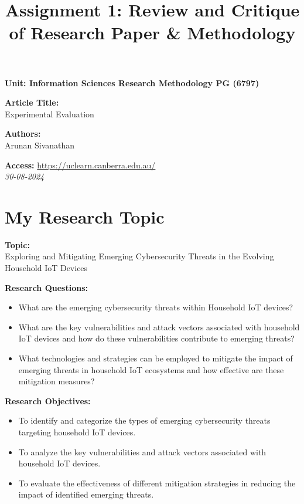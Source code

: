 \documentclass[a4paper,12pt]{article}
\title{Assignment 1: Review and Critique of Research Paper \& Methodology}
\author{}
\date{}
\begin{document}
\maketitle
\begin{flushleft}

\textbf{Unit: Information Sciences Research Methodology PG (6797)}

\vspace{0.5cm}

\textbf{Article Title:} \\
Experimental Evaluation 

\vspace{0.3cm}

\textbf{Authors:} \\
Arunan Sivanathan

\vspace{0.3cm}

\textbf{Access:} \url{https://uclearn.canberra.edu.au/} \\
\textit{30-08-2024}

\vspace{0.5cm}

\section*{My Research Topic}
\textbf{Topic:} \\
Exploring and Mitigating Emerging Cybersecurity Threats in the Evolving Household IoT Devices

\vspace{0.3cm}

\textbf{Research Questions:}
\begin{itemize}[noitemsep]
    \item What are the emerging cybersecurity threats within Household IoT devices?
    \item What are the key vulnerabilities and attack vectors associated with household IoT devices and how do these vulnerabilities contribute to emerging threats?
    \item What technologies and strategies can be employed to mitigate the impact of emerging threats in household IoT ecosystems and how effective are these mitigation measures?
\end{itemize}

\vspace{0.3cm}

\textbf{Research Objectives:}
\begin{itemize}[noitemsep]
    \item To identify and categorize the types of emerging cybersecurity threats targeting household IoT devices.
    \item To analyze the key vulnerabilities and attack vectors associated with household IoT devices.
    \item To evaluate the effectiveness of different mitigation strategies in reducing the impact of identified emerging threats.
\end{itemize}


\end{flushleft}
\end{document}
